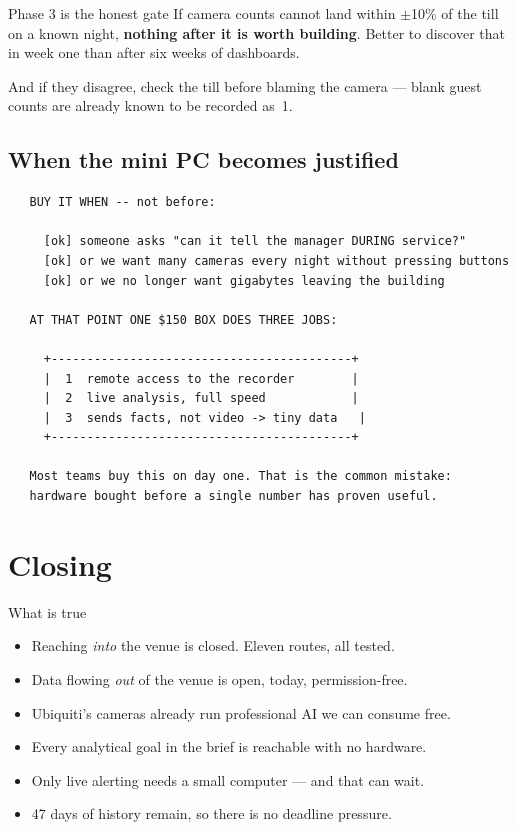 \documentclass[11pt,a4paper]{article}
\begin{document}
\begin{alert}{Phase 3 is the honest gate}
If camera counts cannot land within $\pm$10\% of the till on a known night,
\textbf{nothing after it is worth building}. Better to discover that in week
one than after six weeks of dashboards.

\vspace{4pt}
And if they disagree, check the till before blaming the camera --- blank
guest counts are already known to be recorded as~1.
\end{alert}

\subsection{When the mini PC becomes justified}

\begin{verbatim}
   BUY IT WHEN -- not before:

     [ok] someone asks "can it tell the manager DURING service?"
     [ok] or we want many cameras every night without pressing buttons
     [ok] or we no longer want gigabytes leaving the building

   AT THAT POINT ONE $150 BOX DOES THREE JOBS:

     +------------------------------------------+
     |  1  remote access to the recorder        |
     |  2  live analysis, full speed            |
     |  3  sends facts, not video -> tiny data   |
     +------------------------------------------+

   Most teams buy this on day one. That is the common mistake:
   hardware bought before a single number has proven useful.
\end{verbatim}

\section{Closing}

\begin{good}{What is true}
\begin{itemize}[leftmargin=14pt,itemsep=2pt]
  \item Reaching \emph{into} the venue is closed. Eleven routes, all tested.
  \item Data flowing \emph{out} of the venue is open, today, permission-free.
  \item Ubiquiti's cameras already run professional AI we can consume free.
  \item Every analytical goal in the brief is reachable with no hardware.
  \item Only live alerting needs a small computer --- and that can wait.
  \item 47 days of history remain, so there is no deadline pressure.
\end{itemize}
\end{good}
\end{document}
